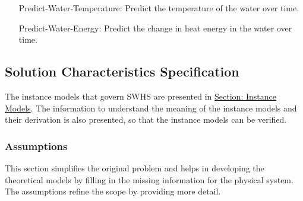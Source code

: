 \documentclass[12pt]{article}
\begin{document}
\begin{itemize}
\item[Predict-Water-Temperature:\phantomsection\label{waterTempGS}]Predict the temperature of the water over time.
\item[Predict-Water-Energy:\phantomsection\label{waterEnergyGS}]Predict the change in heat energy in the water over time.
\end{itemize}
\subsection{Solution Characteristics Specification}
\label{Sec:SolCharSpec}
The instance models that govern SWHS are presented in \hyperref[Sec:IMs]{Section: Instance Models}. The information to understand the meaning of the instance models and their derivation is also presented, so that the instance models can be verified.

\subsubsection{Assumptions}
\label{Sec:Assumps}
This section simplifies the original problem and helps in developing the theoretical models by filling in the missing information for the physical system. The assumptions refine the scope by providing more detail.
\end{document}
